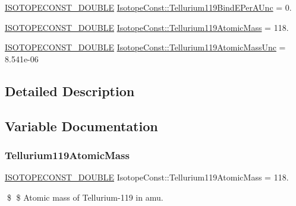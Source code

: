 \begin{DoxyCompactItemize}
\mbox{\hyperlink{group___isotope_const-_macros_ga8f45a7272ce02c0b4c65c44636ed719a}{I\+S\+O\+T\+O\+P\+E\+C\+O\+N\+S\+T\+\_\+\+D\+O\+U\+B\+LE}} \mbox{\hyperlink{group___isotope_const-_tellurium-_te119_ga98b6d561127e8a5ab3429e8950e3c091}{Isotope\+Const\+::\+Tellurium119\+Bind\+E\+Per\+A\+Unc}} = 0.
\item 
\mbox{\hyperlink{group___isotope_const-_macros_ga8f45a7272ce02c0b4c65c44636ed719a}{I\+S\+O\+T\+O\+P\+E\+C\+O\+N\+S\+T\+\_\+\+D\+O\+U\+B\+LE}} \mbox{\hyperlink{group___isotope_const-_tellurium-_te119_gad14a9260b8b77779156a2d9963bb1577}{Isotope\+Const\+::\+Tellurium119\+Atomic\+Mass}} = 118.
\item 
\mbox{\hyperlink{group___isotope_const-_macros_ga8f45a7272ce02c0b4c65c44636ed719a}{I\+S\+O\+T\+O\+P\+E\+C\+O\+N\+S\+T\+\_\+\+D\+O\+U\+B\+LE}} \mbox{\hyperlink{group___isotope_const-_tellurium-_te119_gae3012c81f257f590efc3d66a029dd72d}{Isotope\+Const\+::\+Tellurium119\+Atomic\+Mass\+Unc}} = 8.\+541e-\/06
\end{DoxyCompactItemize}


\subsection{Detailed Description}


\subsection{Variable Documentation}
\mbox{\label{group___isotope_const-_tellurium-_te119_gad14a9260b8b77779156a2d9963bb1577}} 
\subsubsection{\texorpdfstring{Tellurium119\+Atomic\+Mass}{Tellurium119AtomicMass}}
{\footnotesize\ttfamily \mbox{\hyperlink{group___isotope_const-_macros_ga8f45a7272ce02c0b4c65c44636ed719a}{I\+S\+O\+T\+O\+P\+E\+C\+O\+N\+S\+T\+\_\+\+D\+O\+U\+B\+LE}} Isotope\+Const\+::\+Tellurium119\+Atomic\+Mass = 118.}

\$ \$ Atomic mass of Tellurium-\/119 in amu. \mbox{\label{group___isotope_const-_tellurium-_te119_gae3012c81f257f590efc3d66a029dd72d}} 
